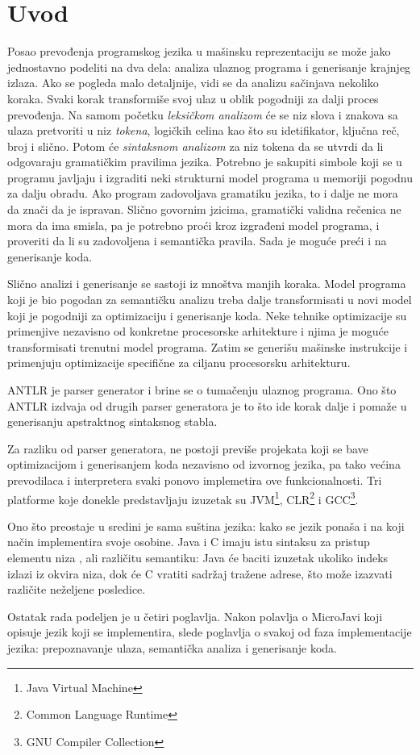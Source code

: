 \chapter{Uvod}

Posao prevođenja programskog jezika u mašinsku reprezentaciju se može jako jednostavno podeliti na dva dela: analiza ulaznog programa i generisanje krajnjeg izlaza\cite{dragon}. 
Ako se pogleda malo detaljnije, vidi se da analizu sačinjava nekoliko koraka. 
Svaki korak transformiše svoj ulaz u oblik pogodniji za dalji proces prevođenja. 
Na samom početku \emph{leksičkom analizom} će se niz slova i znakova sa ulaza pretvoriti u niz \emph{tokena}, logičkih celina kao što su idetifikator, ključna reč, broj i slično. 
Potom će \emph{sintaksnom analizom} za niz tokena da se utvrdi da li odgovaraju gramatičkim pravilima jezika. 
Potrebno je sakupiti simbole koji se u programu javljaju i izgraditi neki strukturni model programa u memoriji pogodnu za dalju obradu. 
Ako program zadovoljava gramatiku jezika, to i dalje ne mora da znači da je ispravan. 
Slično govornim jzicima, gramatički validna rečenica ne mora da ima smisla, pa je potrebno proći kroz izgrađeni model programa, i proveriti da li su zadovoljena i semantička pravila. 
Sada je moguće preći i na generisanje koda.

Slično analizi i generisanje se sastoji iz mnoštva manjih koraka. 
Model programa koji je bio pogodan za semantičku analizu treba dalje transformisati u novi model koji je pogodniji za optimizaciju i generisanje koda. 
Neke tehnike optimizacije su primenjive nezavisno od konkretne procesorske arhitekture i njima je moguće transformisati trenutni model programa. 
Zatim se generišu mašinske instrukcije i primenjuju optimizacije specifične za ciljanu procesorsku arhitekturu.

ANTLR je parser generator i brine se o tumačenju ulaznog programa. Ono što ANTLR izdvaja od drugih parser generatora je to što ide korak dalje i pomaže u generisanju apstraktnog sintaksnog stabla.

Za razliku od parser generatora, ne postoji previše projekata koji se bave optimizacijom i generisanjem koda nezavisno od izvornog jezika, pa tako većina prevodilaca i interpretera svaki ponovo implemetira ove funkcionalnosti. 
Tri platforme koje donekle predstavljaju izuzetak su JVM\footnote{\skr \eng Java Virtual Machine}, CLR\footnote{\skr \eng Common Language Runtime} i GCC\footnote{\skr \eng GNU Compiler Collection}. %

Ono što preostaje u sredini je sama suština jezika: kako se jezik ponaša i na koji način implementira svoje osobine. 
Java i C imaju istu sintaksu za pristup elementu niza \textmdash {}, ali različitu semantiku: 
Java će baciti izuzetak ukoliko indeks izlazi iz okvira niza, dok će C vratiti sadržaj tražene adrese, što može izazvati različite neželjene posledice.

Ostatak rada podeljen je u četiri poglavlja.
Nakon polavlja o MicroJavi koji opisuje jezik koji se implementira, slede poglavlja o svakoj od faza implementacije jezika: prepoznavanje ulaza, semantička analiza i generisanje koda.
